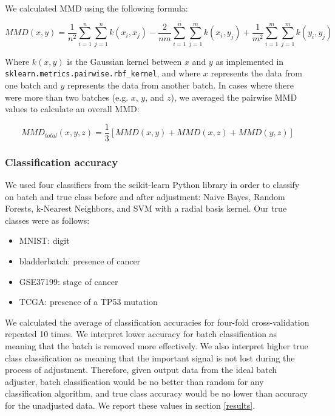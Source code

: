 \documentclass[notitlepage]{article}
\begin{document}
We calculated MMD using the following formula:

\begin{equation}
	\label{mmd}
	MMD(x, y) = \frac{1}{n^2}\sum_{i=1}^n{\sum_{j=1}^n{k(x_i, x_j)}} - \frac{2}{nm}\sum_{i=1}^n{\sum_{j=1}^m{k(x_i, y_j)}} + \frac{1}{m^2}\sum_{i=1}^m{\sum_{j=1}^m{k(y_i, y_j)}}
\end{equation}

Where $k(x, y)$ is the Gaussian kernel between $x$ and $y$ as implemented in \texttt{sklearn.metrics.pairwise.rbf\_kernel}, and where $x$ represents the data from one batch and $y$ represents the data from another batch.
In cases where there were more than two batches (e.g. $x$, $y$, and $z$), we averaged the pairwise MMD values to calculate an overall MMD:

\begin{equation}
	\label{mmd-mean}
	MMD_{total}(x, y, z) = \frac{1}{3}[MMD(x, y) + MMD(x, z) + MMD(y, z)]
\end{equation}

\subsubsection{Classification accuracy}

We used four classifiers from the scikit-learn Python library in order to classify on batch and true class before and after adjustment: Naive Bayes, Random Forests, k-Nearest Neighbors, and SVM with a radial basis kernel.
Our true classes were as follows:

\begin{itemize}
	\item MNIST: digit
	\item bladderbatch: presence of cancer
	\item GSE37199: stage of cancer
	\item TCGA: presence of a TP53 mutation
\end{itemize}

We calculated the average of classification accuracies for four-fold cross-validation repeated 10 times.
We interpret lower accuracy for batch classification as meaning that the batch is removed more effectively.
We also interpret higher true class classification as meaning that the important signal is not lost during the process of adjustment.
Therefore, given output data from the ideal batch adjuster, batch classification would be no better than random for any classification algorithm, and true class accuracy would be no lower than accuracy for the unadjusted data.
We report these values in section \ref{results}.
\end{document}
